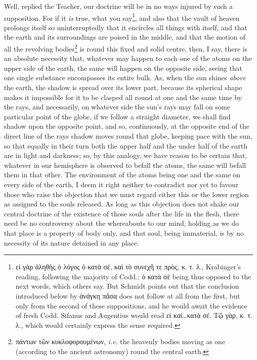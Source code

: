 Well, replied the Teacher, our doctrine will be in no ways injured by such a supposition. For if it \emph{is} true, what you say\footnote{\textgreek{εἰ γὰρ ἀληθὴς ὁ λόγος ὁ κατὰ σέ, καὶ τὸ συνεχῆ τε πρὸς, κ. τ. λ}., Krabinger’s reading, following the majority of Codd.; \textgreek{ὁ κατὰ σέ} being thus opposed to the next words, which others say. But Schmidt points out that the conclusion introduced below by \textgreek{ἀνάγκη πᾶσα} does not follow at all from the first, but only from the second of these suppositions, and he would await the evidence of fresh Codd. Sifanus and Augentius would read \textgreek{εἰ καὶ…κατὰ σέ}. \textgreek{Τῷ γὰρ, κ. τ. λ}., which would certainly express the sense required.}, and also that the vault of heaven prolongs itself so uninterruptedly that it encircles all things with itself, and that the earth and its surroundings are poised in the middle, and that the motion of all the revolving bodies\footnote{\textgreek{πάντων τῶν κυκλοφορουμένων}, \emph{i.e.} the heavenly bodies moving as one (according to the ancient astronomy) round the central earth.} is round this fixed and solid centre, then, I say, there is an absolute necessity that, whatever may happen to each one of the atoms on the upper side of the earth, the same will happen on the opposite side, seeing that one single substance encompasses its entire bulk. As, when the sun shines \emph{above} the earth, the shadow is spread over its lower part, because its spherical shape makes it impossible for it to be clasped all round at one and the same time by the rays, and necessarily, on whatever side the sun’s rays may fall on some particular point of the globe, if we follow a straight diameter, we shall find shadow upon the opposite point, and so, continuously, at the opposite end of the direct line of the rays shadow moves round that globe, keeping pace with the sun, so that equally in their turn both the upper half and the under half of the earth are in light and darkness; so, by this analogy, we have reason to be certain that, whatever in our hemisphere is observed to befall the atoms, the same will befall them in that other. The environment of the atoms being one and the same on every side of the earth, I deem it right neither to contradict nor yet to favour those who raise the objection that we must regard either this or the lower region as assigned to the souls released. As long as this objection does not shake our central doctrine of the existence of those souls after the life in the flesh, there need be no controversy about the whereabouts to our mind, holding as we do that place is a property of body only, and that soul, being immaterial, is by no necessity of its nature detained in any place.

